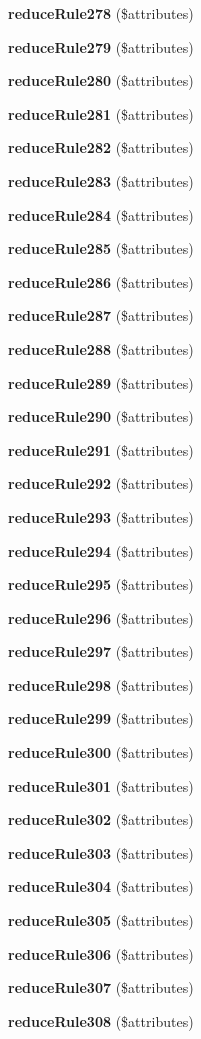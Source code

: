 \begin{DoxyCompactItemize}
\item 
{\bf reduce\+Rule278} (\$attributes)
\item 
{\bf reduce\+Rule279} (\$attributes)
\item 
{\bf reduce\+Rule280} (\$attributes)
\item 
{\bf reduce\+Rule281} (\$attributes)
\item 
{\bf reduce\+Rule282} (\$attributes)
\item 
{\bf reduce\+Rule283} (\$attributes)
\item 
{\bf reduce\+Rule284} (\$attributes)
\item 
{\bf reduce\+Rule285} (\$attributes)
\item 
{\bf reduce\+Rule286} (\$attributes)
\item 
{\bf reduce\+Rule287} (\$attributes)
\item 
{\bf reduce\+Rule288} (\$attributes)
\item 
{\bf reduce\+Rule289} (\$attributes)
\item 
{\bf reduce\+Rule290} (\$attributes)
\item 
{\bf reduce\+Rule291} (\$attributes)
\item 
{\bf reduce\+Rule292} (\$attributes)
\item 
{\bf reduce\+Rule293} (\$attributes)
\item 
{\bf reduce\+Rule294} (\$attributes)
\item 
{\bf reduce\+Rule295} (\$attributes)
\item 
{\bf reduce\+Rule296} (\$attributes)
\item 
{\bf reduce\+Rule297} (\$attributes)
\item 
{\bf reduce\+Rule298} (\$attributes)
\item 
{\bf reduce\+Rule299} (\$attributes)
\item 
{\bf reduce\+Rule300} (\$attributes)
\item 
{\bf reduce\+Rule301} (\$attributes)
\item 
{\bf reduce\+Rule302} (\$attributes)
\item 
{\bf reduce\+Rule303} (\$attributes)
\item 
{\bf reduce\+Rule304} (\$attributes)
\item 
{\bf reduce\+Rule305} (\$attributes)
\item 
{\bf reduce\+Rule306} (\$attributes)
\item 
{\bf reduce\+Rule307} (\$attributes)
\item 
{\bf reduce\+Rule308} (\$attributes)

\end{DoxyCompactItemize}
